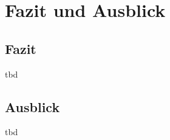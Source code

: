 \section{Fazit und Ausblick}

\subsection{Fazit}
\color{red}
tbd
\color{black}

\subsection{Ausblick}
\color{red}
tbd
\color{black}
